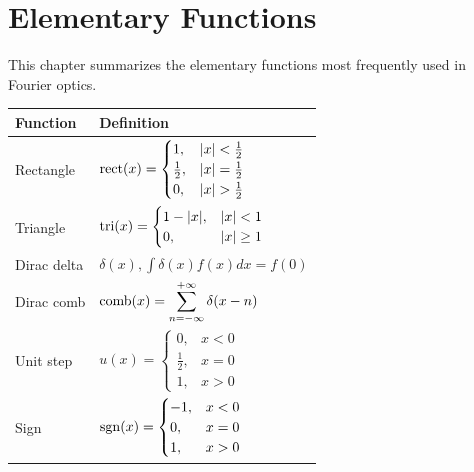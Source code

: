 %
%

\chapter{Elementary Functions}

This chapter summarizes the elementary functions most frequently used in
Fourier optics.


\begin{center}
\begin{tabular}{ll}
\toprule
Function & Definition\\
\midrule

Rectangle &
$\displaystyle
\rect(x)=
\begin{cases}
1,&|x|<\frac12\\
\frac12,&|x|=\frac12\\
0,&|x|>\frac12
\end{cases}
$

\\[0.7cm]

Triangle &
$\displaystyle
\operatorname{tri}(x)=
\begin{cases}
1-|x|,&|x|<1\\
0,&|x|\ge1
\end{cases}
$

\\[0.7cm]
Dirac delta &
$\delta(x), \int \delta(x) f(x) dx = f(0)$
\\[0.3cm]

Dirac comb &
$\displaystyle
\operatorname{comb}(x)=
\sum_{n=-\infty}^{+\infty}
\delta(x-n)
$

\\[0.5cm]

Unit step &
$\displaystyle
u(x)=
\begin{cases}
0,&x<0\\
\frac12,&x=0\\
1,&x>0
\end{cases}
$

\\[0.7cm]

Sign &
$\displaystyle
\operatorname{sgn}(x)=
\begin{cases}
-1,&x<0\\
0,&x=0\\
1,&x>0
\end{cases}
$


\end{tabular}
\end{center}
